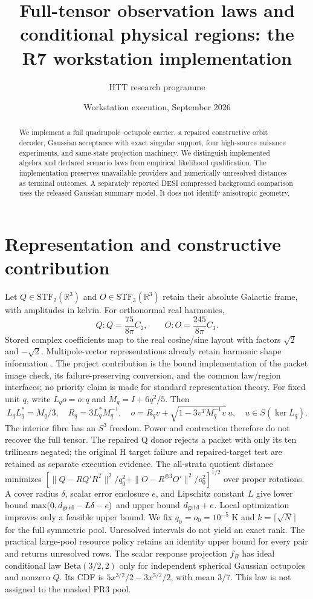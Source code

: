 \documentclass[11pt]{article}
\title{Full-tensor observation laws and conditional physical regions: the R7 workstation implementation}
\author{HTT research programme}\date{Workstation execution, September 2026}
\begin{document}
\maketitle
\begin{abstract}
We implement a full quadrupole--octupole carrier, a repaired constructive orbit decoder, Gaussian acceptance with exact singular support, four high-source nuisance experiments, and same-state projection machinery. We distinguish implemented algebra and declared scenario laws from empirical likelihood qualification. The implementation preserves unavailable providers and numerically unresolved distances as terminal outcomes. A separately reported DESI compressed background comparison uses the released Gaussian summary model. It does not identify anisotropic geometry.
\end{abstract}
\section{Representation and constructive contribution}
Let $Q\in\mathrm{STF}_2(\mathbb R^3)$ and $O\in\mathrm{STF}_3(\mathbb R^3)$ retain their absolute Galactic frame, with amplitudes in kelvin. For orthonormal real harmonics,
\begin{equation}Q:Q=\frac{75}{8\pi}C_2,\qquad O:O=\frac{245}{8\pi}C_3.\end{equation}
Stored complex coefficients map to the real cosine/sine layout with factors $\sqrt2$ and $-\sqrt2$. Multipole-vector representations already retain harmonic shape information \cite{land}. The project contribution is the bound implementation of the packet image check, its failure-preserving conversion, and the common law/region interfaces; no priority claim is made for standard representation theory.
For fixed unit $q$, write $L_qo=o:q$ and $M_q=I+6q^2/5$. Then
\begin{equation}L_qL_q^*=M_q/3,\quad R_q=3L_q^*M_q^{-1},\quad o=R_qv+\sqrt{1-3v^TM_q^{-1}v}\,u,\quad u\in S(\ker L_q).\end{equation}
The interior fibre has an $S^3$ freedom. Power and contraction therefore do not recover the full tensor. The repaired Q donor rejects a packet with only its ten trilinears negated; the original H target failure and repaired-target test are retained as separate execution evidence.
The all-strata quotient distance minimizes $[\|Q-RQ'R^T\|^2/q_0^2+\|O-R^{\otimes3}O'\|^2/o_0^2]^{1/2}$ over proper rotations. A cover radius $\delta$, scalar error enclosure $e$, and Lipschitz constant $L$ give lower bound $\max(0,d_{\rm grid}-L\delta-e)$ and upper bound $d_{\rm grid}+e$. Local optimization improves only a feasible upper bound. We fix $q_0=o_0=10^{-5}$ K and $k=\lceil\sqrt N\rceil$ for the full symmetric pool. Unresolved intervals do not yield an exact rank. The practical large-pool resource policy retains an identity upper bound for every pair and returns unresolved rows.
The scalar response projection $f_B$ has ideal conditional law $\mathrm{Beta}(3/2,2)$ only for independent spherical Gaussian octupoles and nonzero $Q$. Its CDF is $5x^{3/2}/2-3x^{5/2}/2$, with mean $3/7$. This law is not assigned to the masked PR3 pool.
\end{document}

